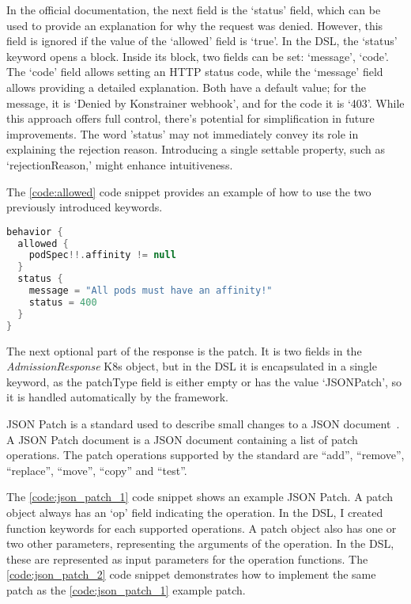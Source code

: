 In the official documentation, the next field is the `status' field, which can be used to provide an explanation for why the request was denied. However, this field is ignored if the value of the `allowed' field is `true'. In the DSL, the `status' keyword opens a block. Inside its block, two fields can be set: `message', `code'. The `code' field allows setting an HTTP status code, while the `message' field allows providing a detailed explanation. Both have a default value; for the message, it is `Denied by Konstrainer webhook', and for the code it is `403'. While this approach offers full control, there's potential for simplification in future improvements. The word 'status' may not immediately convey its role in explaining the rejection reason. Introducing a single settable property, such as `rejectionReason,' might enhance intuitiveness.

The \ref{code:allowed} code snippet provides an example of how to use the two previously introduced keywords.

\begin{lstlisting}[caption={Usage of `allowed' and `status'},language=Kotlin,label=code:allowed]
behavior {
  allowed {
    podSpec!!.affinity != null
  }
  status {
    message = "All pods must have an affinity!"
    status = 400
  }
}
\end{lstlisting}

The next optional part of the response is the patch. It is two fields in the \emph{AdmissionResponse} K8s object, but in the DSL it is encapsulated in a single keyword, as the patchType field is either empty or has the value `JSONPatch', so it is handled automatically by the framework. 

JSON Patch is a standard used to describe small changes to a JSON document~\cite{JSONPatch}. A JSON Patch document is a JSON document containing a list of patch operations. The patch operations supported by the standard are “add”, “remove”, “replace”, “move”, “copy” and “test”.

The \ref{code:json_patch_1} code snippet shows an example JSON Patch. A patch object always has an `op' field indicating the operation. In the DSL, I created function keywords for each supported operations. A patch object also has one or two other parameters, representing the arguments of the operation. In the DSL, these are represented as input parameters for the operation functions. The \ref{code:json_patch_2} code snippet demonstrates how to implement the same patch as the \ref{code:json_patch_1} example patch.

